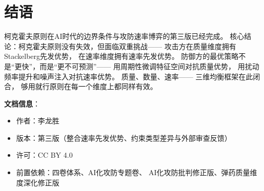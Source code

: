 \documentclass[11pt,a4paper]{article}
\begin{document}
\section{结语}

柯克霍夫原则在AI时代的边界条件与攻防速率博弈的第三版已经完成。
核心结论：柯克霍夫原则没有失效，但面临双重挑战——
攻击方在质量维度拥有Stackelberg先发优势，
在速率维度拥有速率先发优势。
防御方的最优策略不是“更快”，而是“更不可预测”——
用周期性微调特征空间对抗质量优势，
用扰动频率提升和噪声注入对抗速率优势。
质量、数量、速率——
三维均衡框架在此闭合，
够用就行原则在每一个维度上都同样有效。

\vspace{5mm}
\noindent\textbf{文档信息}：
\begin{itemize}
    \item 作者：李龙胜
    \item 版本：第三版（整合速率先发优势、约束类型差异与外部审查反馈）
    \item 许可：CC BY 4.0
    \item 前置依赖：四卷体系、AI化攻防专题卷、
          AI化攻防批判修正版、弹药质量维度深化修正版
\end{itemize}
\end{document}
